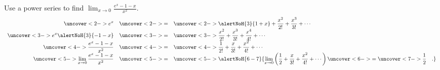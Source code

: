 \begin{frame}
\begin{example}
Use a power series to find $\displaystyle \lim_{x\to 0}\frac{e^x - 1 - x}{x^2}$.
\abovedisplayskip=0pt
\belowdisplayskip=0pt
\[
\begin{array}{rcl}
\displaystyle \uncover<2->{%
e^x%
}%
& \uncover<2->{=} &%
\displaystyle \uncover<2->{%
\alertNoH{ 3}{1 + x } + \frac{x^2}{2!} + \frac{x^3}{3!} + \cdots %
}\\%
\displaystyle \uncover<3->{%
e^x \alertNoH{ 3}{ - 1 - x}%
}%
& \uncover<3->{=} &%
\displaystyle \uncover<3->{%
\frac{x^2}{2!} + \frac{x^3}{3!} + \frac{x^4}{4!} + \cdots %
}\\%
\displaystyle \uncover<4->{%
\frac{e^x  - 1 - x}{x^2}%
}%
& \uncover<4->{=} &%
\displaystyle \uncover<4->{%
\frac{1}{2!} + \frac{x}{3!} + \frac{x^2}{4!} + \cdots %
}\\%
\displaystyle \uncover<5->{%
\lim_{x\to 0}\frac{e^x  - 1 - x}{x^2}%
}%
& \uncover<5->{=} &%
\displaystyle \uncover<5->{%
\alertNoH{ 6-7}{%
\lim_{x\to 0}\left( \frac{1}{2} + \frac{x}{3!} + \frac{x^2}{4!} + \cdots \right) \uncover<6->{= \uncover<7->{\frac{1}{2}}} \quad .%
}%
}%
\end{array}
\]
\end{example}
\end{frame}
